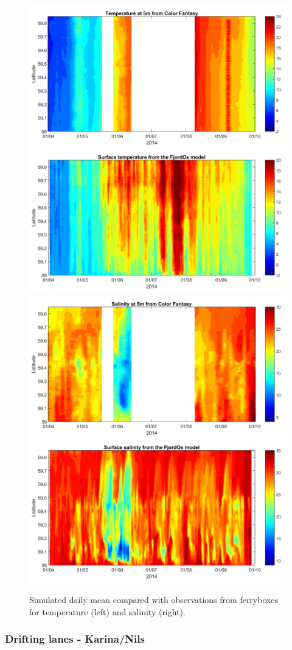 \documentclass[12pt,a4paper,english]{article}
\begin{document}
\begin{figure}[ht]
\centerline{
\includegraphics*[trim=1cm 0cm 1cm 0cm,clip=true,width=.5\textwidth]{Figurer/FjordOs_vs_Ferrybox_TEMP}
\includegraphics*[trim=1cm 0cm 1cm 0cm,clip=true,width=.5\textwidth]{Figurer/FjordOs_vs_Ferrybox_SALT}}
\caption{\small
Simulated daily mean compared with observations from ferryboxes for temperature (left) and salinity (right).}
\label{fig:Ferrybox_temp_salt}
\end{figure}


\subsubsection{Drifting lanes - Karina/Nils}

\clearpage 

%
\end{document}
